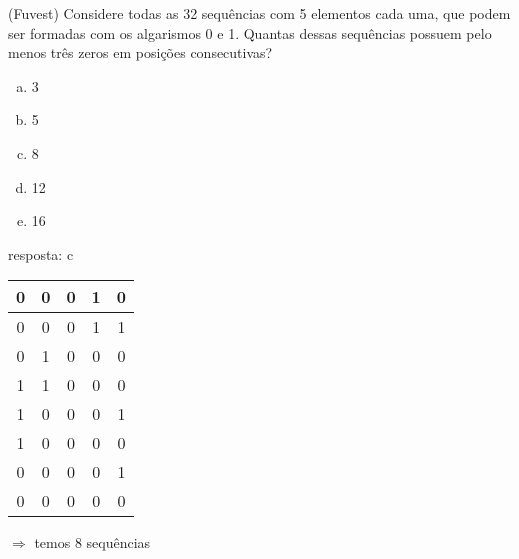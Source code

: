 \begin{ex}
(Fuvest) Considere todas as 32 sequências com 5 elementos cada uma, que podem ser formadas com os algarismos 0 e 1. Quantas dessas sequências possuem pelo menos três zeros em posições consecutivas?
   \begin{enumerate}[(a)]
   \item 3
   \item 5
   \item 8
   \item 12
   \item 16
   \end{enumerate}
     \begin{sol}
      resposta: c\\
      \begin{tabular}{|c|c|c|c|c|} \hline
          0 & 0 & 0 & 1 & 0  \\ \hline
          0 & 0 & 0 & 1 & 1  \\ \hline
          0 & 1 & 0 & 0 & 0  \\ \hline
          1 & 1 & 0 & 0 & 0  \\ \hline
          1 & 0 & 0 & 0 & 1  \\ \hline
          1 & 0 & 0 & 0 & 0  \\ \hline
          0 & 0 & 0 & 0 & 1  \\ \hline
          0 & 0 & 0 & 0 & 0  \\ \hline
       
      \end{tabular}
       $\Rightarrow$  temos 8 sequências
     \end{sol}
\end{ex}
